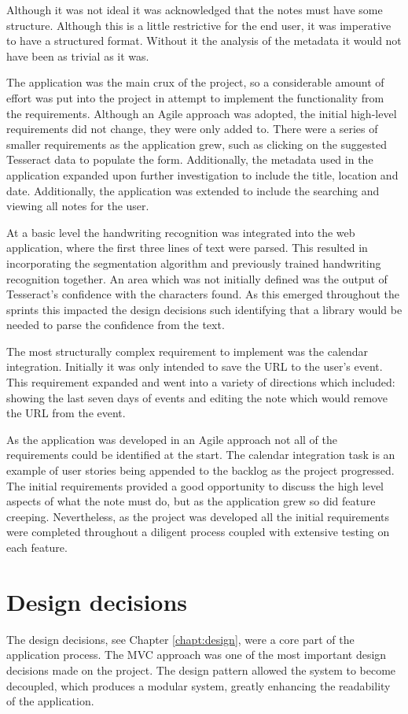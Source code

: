 Although it was not ideal it was acknowledged that the notes must have some structure. Although this is a little restrictive for the end user, it was imperative to have a structured format. Without it the analysis of the metadata it would not have been as trivial as it was.

The application was the main crux of the project, so a considerable amount of effort was put into the project in attempt to implement the functionality from the requirements. Although an Agile approach was adopted, the initial high-level requirements did not change, they were only added to. There were a series of smaller requirements as the application grew, such as clicking on the suggested Tesseract data to populate the form. Additionally, the metadata used in the application expanded upon further investigation to include the title, location and date. Additionally, the application was extended to include the searching and viewing all notes for the user.

At a basic level the handwriting recognition was integrated into the web application, where the first three lines of text were parsed. This resulted in incorporating the segmentation algorithm and previously trained handwriting recognition together. An area which was not initially defined was the output of Tesseract's confidence with the characters found. As this emerged throughout the sprints this impacted the design decisions such identifying that a library would be needed to parse the confidence from the text.

The most structurally complex requirement to implement was the calendar integration. Initially it was only intended to save the URL to the user's event. This requirement expanded and went into a variety of directions which included: showing the last seven days of events and editing the note which would remove the URL from the event.

As the application was developed in an Agile approach not all of the requirements could be identified at the start. The calendar integration task is an example of user stories being appended to the backlog as the project progressed. The initial requirements provided a good opportunity to discuss the high level aspects of what the note must do, but as the application grew so did feature creeping. Nevertheless, as the project was developed all the initial requirements were completed throughout a diligent process coupled with extensive testing on each feature.

\section{Design decisions}
The design decisions, see Chapter \ref{chapt:design}, were a core part of the application process. The MVC approach was one of the most important design decisions made on the project. The design pattern allowed the system to become decoupled, which produces a modular system, greatly enhancing the readability of the application.

